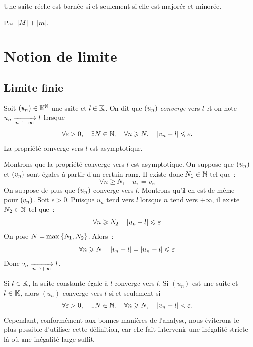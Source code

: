 \documentclass{magnolia}
\begin{document}
\begin{proposition}
Une suite réelle est bornée si et seulement si elle est majorée et minorée.
\end{proposition}

\begin{preuve}
Par $\left|M\right|+\left|m\right|$.
\end{preuve}



\section{Notion de limite}

\subsection{Limite finie}

\begin{definition}[utile=-3]
Soit $\left(u_n\right)\in\mathbb{K}^{\mathbb{N}}$ une suite et $l\in\mathbb{K}$. On dit que $\left(u_n\right)$ \emph{converge} vers $l$
et on note $u_n\xrightarrow[n\rightarrow +\infty]{} l$ lorsque
\[\forall \varepsilon>0 ,\quad \exists N\in\mathbb{N} ,\quad \forall n\geqslant N ,\quad
  \left|u_n-l\right|\leqslant\varepsilon.\]
La propriété \og converge vers $l$ \fg est asymptotique.
\end{definition}

\begin{preuve}
Montrons que la propriété \og converge vers $l$ \fg est asymptotique.
On suppose que $\left(u_n\right)$ et $\left(v_n\right)$ sont égales à partir d'un certain rang.
Il existe donc $N_1\in\mathbb{N}$ tel que~:
\[\forall n\geq N_1 \quad u_n=v_n\]
On suppose de plus que $\left(u_n\right)$ converge vers $l$. Montrons qu'il en est de
même pour $\left(v_n\right)$. Soit $\epsilon>0$. Puisque $u_n$ tend vers $l$ lorsque $n$
tend vers $+\infty$, il existe $N_2\in\mathbb{N}$ tel que~:
\[\forall n\geqslant N_2 \quad \left|u_n-l\right|\leqslant\varepsilon\]
On pose $N=\max\left\{N_1,N_2\right\}$. Alors~:
\[\forall n\geqslant N \quad \left|v_n-l\right|=\left|u_n-l\right|\leqslant \varepsilon\]
Donc $v_n\xrightarrow[n\rightarrow +\infty]{} l$.
\end{preuve}

\begin{remarques}
\remarque Si $l\in\mathbb{K}$, la suite constante égale à $l$ converge vers $l$.
\remarque Si $(u_n)$ est une suite et $l\in\mathbb{K}$, alors $(u_n)$ converge vers $l$
  si et seulement si
  \[\forall \varepsilon>0 ,\quad \exists N\in\mathbb{N} ,\quad \forall n\geqslant N ,\quad
    \left|u_n-l\right|<\varepsilon.\]
  Cependant, conformément aux bonnes manières de l'analyse, nous éviterons le plus
  possible d'utiliser cette définition, car elle fait intervenir une
  inégalité stricte là où une inégalité large suffit.
\end{remarques}
\end{document}
